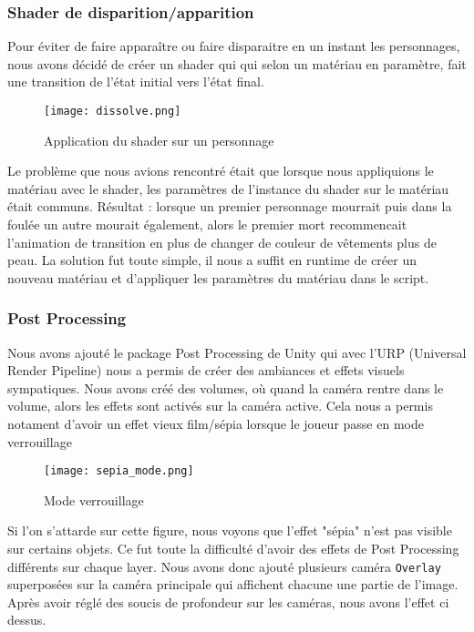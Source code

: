 \subsubsection{Shader de disparition/apparition}
Pour éviter de faire apparaître ou faire disparaitre en un instant les personnages, nous avons décidé de créer un shader qui qui selon un matériau en paramètre, 
fait une transition de l'état initial vers l'état final. 
\begin{figure}[hbt!]
    \centering
    \texttt{[image: dissolve.png]}
    \caption{Application du shader sur un personnage}

\end{figure}
\FloatBarrier

Le problème que nous avions rencontré était que lorsque nous appliquions le matériau avec le shader,
les paramètres de l'instance du shader sur le matériau était communs. Résultat : lorsque un premier personnage mourrait puis dans la foulée un autre mourait également,
alors le premier mort recommencait l'animation de transition en plus de changer de couleur de vêtements plus de peau.
La solution fut toute simple, il nous a suffit en runtime de créer un nouveau matériau et d'appliquer les paramètres du matériau dans le script.



\subsubsection{Post Processing}

Nous avons ajouté le package Post Processing de Unity qui avec l'URP (Universal Render Pipeline)
nous a permis de créer des ambiances et effets visuels sympatiques.
Nous avons créé des volumes, où quand la caméra rentre dans le volume, alors les effets sont activés sur la caméra active.
Cela nous a permis notament d'avoir un effet vieux film/sépia lorsque le joueur passe en mode verrouillage

\begin{figure}[hbt!]
    \centering
    \texttt{[image: sepia\_mode.png]}
    \caption{Mode verrouillage}
\end{figure}
\FloatBarrier


Si l'on s'attarde sur cette figure, nous voyons que l'effet "sépia" n'est pas visible sur certains objets.
Ce fut toute la difficulté d'avoir des effets de Post Processing différents sur chaque layer.
Nous avons donc ajouté plusieurs caméra \texttt{Overlay} superposées sur la caméra principale qui affichent chacune une partie de l'image.
Après avoir réglé des soucis de profondeur sur les caméras, nous avons l'effet ci dessus.
